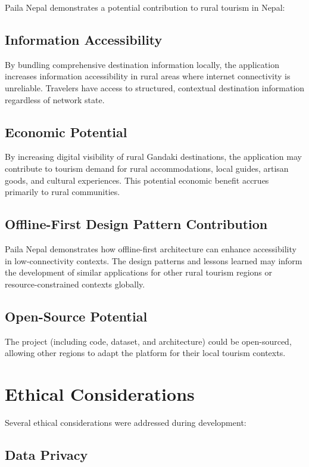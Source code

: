 \documentclass[12pt,a4paper,oneside]{report}
\begin{document}
Paila Nepal demonstrates a potential contribution to rural tourism in Nepal:

\subsection{Information Accessibility}

By bundling comprehensive destination information locally, the application increases information accessibility in rural areas where internet connectivity is unreliable. Travelers have access to structured, contextual destination information regardless of network state.

\subsection{Economic Potential}

By increasing digital visibility of rural Gandaki destinations, the application may contribute to tourism demand for rural accommodations, local guides, artisan goods, and cultural experiences. This potential economic benefit accrues primarily to rural communities.

\subsection{Offline-First Design Pattern Contribution}

Paila Nepal demonstrates how offline-first architecture can enhance accessibility in low-connectivity contexts. The design patterns and lessons learned may inform the development of similar applications for other rural tourism regions or resource-constrained contexts globally.

\subsection{Open-Source Potential}

The project (including code, dataset, and architecture) could be open-sourced, allowing other regions to adapt the platform for their local tourism contexts.

\section{Ethical Considerations}
\label{sec:ethics}

Several ethical considerations were addressed during development:

\subsection{Data Privacy}
\end{document}
